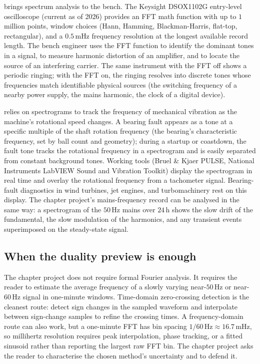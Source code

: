  brings spectrum analysis
to the bench. The Keysight DSOX1102G entry-level oscilloscope
(current as of 2026) provides an FFT math function with up to
$1$ million points, window choices (Hann, Hamming, Blackman-Harris,
flat-top, rectangular), and a $0.5 \,\si{\milli\hertz}$ frequency
resolution at the longest available record length. The bench
engineer uses the FFT function to identify the dominant tones in a
signal, to measure harmonic distortion of an amplifier, and to
locate the source of an interfering carrier. The same instrument
with the FFT off shows a periodic ringing; with the FFT on, the
ringing resolves into discrete tones whose frequencies match
identifiable physical sources (the switching frequency of a
nearby power supply, the mains harmonic, the clock of a digital
device).

 relies on
spectrograms to track the frequency of mechanical vibration as
the machine's rotational speed changes. A bearing fault appears as
a tone at a specific multiple of the shaft rotation frequency
(the bearing's characteristic frequency, set by ball count and
geometry); during a startup or coastdown, the fault tone tracks
the rotational frequency in a spectrogram and is easily separated
from constant background tones. Working tools (Bruel \& Kjaer
PULSE, National Instruments LabVIEW Sound and Vibration Toolkit)
display the spectrogram in real time and overlay the rotational
frequency from a tachometer signal. Bearing-fault diagnostics in
wind turbines, jet engines, and turbomachinery rest on this
display. The chapter project's mains-frequency record can be
analysed in the same way: a spectrogram of the $50 \,\si{\hertz}$
mains over $24 \,\si{\hour}$ shows the slow drift of the
fundamental, the slow modulation of the harmonics, and any
transient events superimposed on the steady-state signal.

\subsection{When the duality preview is enough}

The chapter project does not require formal Fourier analysis. It
requires the reader to estimate the average frequency of a slowly
varying near-$50 \,\si{\hertz}$ or near-$60 \,\si{\hertz}$ signal in
one-minute windows. Time-domain zero-crossing detection is the
cleanest route: detect sign changes in the sampled waveform and
interpolate between sign-change samples to refine the crossing
times. A frequency-domain route can also work, but a one-minute
FFT has bin spacing $1/60 \,\si{\hertz} \approx 16.7 \,\si{\milli
\hertz}$, so millihertz resolution requires peak interpolation,
phase tracking, or a fitted sinusoid rather than reporting the
largest raw FFT bin. The chapter project asks the reader to
characterise the chosen method's uncertainty and to defend it.

